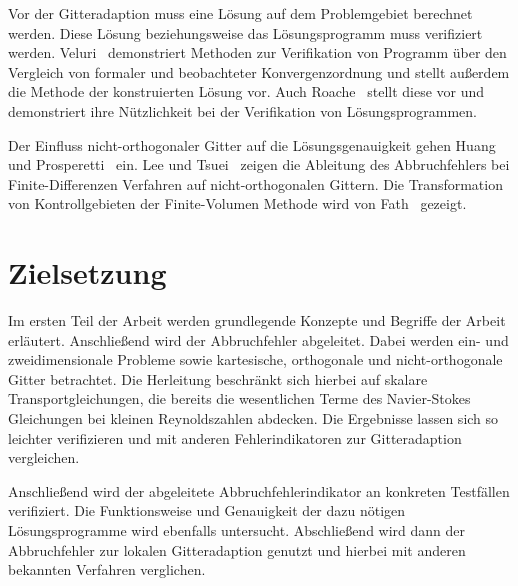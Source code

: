 Vor der Gitteradaption muss eine Lösung auf dem Problemgebiet berechnet werden. Diese
Lösung beziehungsweise das Lösungsprogramm muss verifiziert werden. Veluri~\cite{veluri} demonstriert
Methoden zur Verifikation von Programm über den Vergleich von formaler und beobachteter
Konvergenzordnung und stellt außerdem die Methode der konstruierten Lösung vor.
Auch Roache~\cite{roache} stellt diese vor und demonstriert ihre Nützlichkeit bei der Verifikation von
Lösungsprogrammen.

Der Einfluss nicht-orthogonaler Gitter auf die Lösungsgenauigkeit gehen Huang und Prosperetti~\cite{grid_ortho}
ein. Lee und Tsuei~\cite{lee} zeigen die Ableitung des Abbruchfehlers bei Finite-Differenzen Verfahren
auf nicht-orthogonalen Gittern. Die Transformation von Kontrollgebieten der Finite-Volumen Methode
wird von Fath~\cite{fath} gezeigt.

\section{Zielsetzung}

Im ersten Teil der Arbeit werden grundlegende Konzepte und Begriffe der Arbeit erläutert.
Anschließend wird der Abbruchfehler
abgeleitet. Dabei werden ein- und zweidimensionale Probleme sowie kartesische, orthogonale
und nicht-orthogonale Gitter betrachtet. Die Herleitung beschränkt sich hierbei auf
skalare Transportgleichungen, die bereits die wesentlichen Terme des Navier-Stokes Gleichungen
bei kleinen Reynoldszahlen abdecken. Die Ergebnisse lassen sich so leichter verifizieren
und mit anderen Fehlerindikatoren zur Gitteradaption vergleichen.

Anschließend wird der abgeleitete Abbruchfehlerindikator an konkreten Testfällen verifiziert.
Die Funktionsweise und Genauigkeit der dazu nötigen Lösungsprogramme wird ebenfalls
untersucht. Abschließend wird dann der Abbruchfehler zur lokalen Gitteradaption genutzt
und hierbei mit anderen bekannten Verfahren verglichen.



\cleardoublepage
